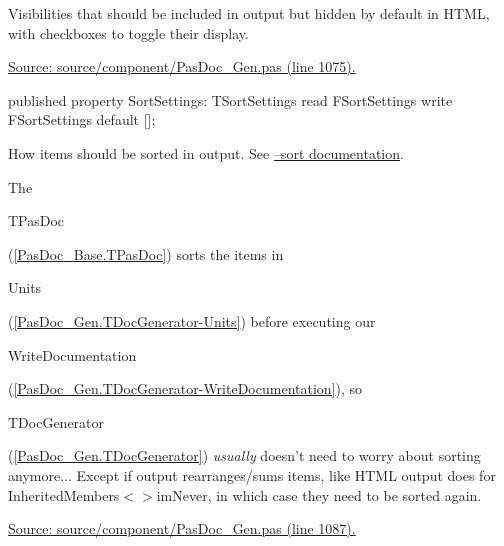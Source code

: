\documentclass{report}
\newif\ifpdf
\begin{document}
\begin{list}{}
\begin{flushleft}
\ifpdf
\end{flushleft}
\fi


\par Visibilities that should be included in output but hidden by default in HTML, with checkboxes to toggle their display.\par
\href{https://github.com/pasdoc/pasdoc/blob/master/source/component/PasDoc_Gen.pas#L1075}{Source: source/component/PasDoc{\_}Gen.pas (line 1075).}\label{PasDoc_Gen.TDocGenerator-SortSettings}
\item[\textbf{SortSettings}\hfill]
\ifpdf
\begin{flushleft}
\fi
\begin{ttfamily}
published property SortSettings: TSortSettings
      read FSortSettings write FSortSettings default [];\end{ttfamily}

\ifpdf
\end{flushleft}
\fi


\par How items should be sorted in output. See \href{https://pasdoc.github.io/SortOption}{--sort documentation}.

The \begin{ttfamily}TPasDoc\end{ttfamily}(\ref{PasDoc_Base.TPasDoc}) sorts the items in \begin{ttfamily}Units\end{ttfamily}(\ref{PasDoc_Gen.TDocGenerator-Units}) before executing our \begin{ttfamily}WriteDocumentation\end{ttfamily}(\ref{PasDoc_Gen.TDocGenerator-WriteDocumentation}), so \begin{ttfamily}TDocGenerator\end{ttfamily}(\ref{PasDoc_Gen.TDocGenerator}) \textit{usually} doesn't need to worry about sorting anymore... Except if output rearranges/sums items, like HTML output does for InheritedMembers{$<$}{$>$}imNever, in which case they need to be sorted again.\par
\href{https://github.com/pasdoc/pasdoc/blob/master/source/component/PasDoc_Gen.pas#L1087}{Source: source/component/PasDoc{\_}Gen.pas (line 1087).}\end{list}
\end{document}
